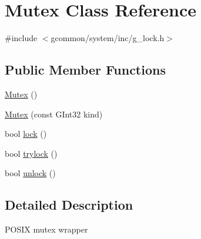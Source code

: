 \hypertarget{class_mutex}{\section{Mutex Class Reference}
\label{class_mutex}
}


{\ttfamily \#include $<$gcommon/system/inc/g\-\_\-lock.\-h$>$}

\subsection*{Public Member Functions}
\begin{DoxyCompactItemize}
\item 
\hyperlink{class_mutex_a577ca9db2a3c4333bc8d0228e2491b04}{Mutex} ()
\item 
\hyperlink{class_mutex_a29cfd4c3ad3d2878290408d7e92d8b94}{Mutex} (const G\-Int32 kind)
\item 
bool \hyperlink{class_mutex_a5153267b9c954e794863dd94900a0e3b}{lock} ()
\item 
bool \hyperlink{class_mutex_a2975f84f1804e5167d674c25aa18d087}{trylock} ()
\item 
bool \hyperlink{class_mutex_adc0b8b863a4e7350297373127a9c7016}{unlock} ()
\end{DoxyCompactItemize}


\subsection{Detailed Description}
P\-O\-S\-I\-X mutex wrapper 

